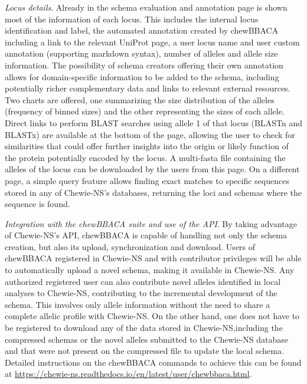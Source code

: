 \textit{Locus details}. Already in the schema evaluation and annotation page is shown most of the information of each locus. This includes the internal locus identification and label, the automated annotation created by chewBBACA including a link to the relevant UniProt \cite{uniprot_consortium_uniprot_2019} page, a user locus name and user custom annotation (supporting markdown syntax), number of alleles and allele size information. The possibility of schema creators offering their own annotation allows for domain-specific information to be added to the schema, including potentially richer complementary data and links to relevant external resources. Two charts are offered, one summarizing the size distribution of the alleles (frequency of binned sizes) and the other representing the sizes of each allele. Direct links to perform \ac{BLAST} searches using allele 1 of that locus (\ac{BLASTn} and \ac{BLASTx}) are available at the bottom of the page, allowing the user to check for similarities that could offer further insights into the origin or likely function of the protein potentially encoded by the locus. A multi-fasta file containing the alleles of the locus can be downloaded by the users from this page. On a different page, a simple query feature allows finding exact matches to specific sequences stored in any of \ac{Chewie-NS}’s databases, returning the loci and schemas where the sequence is found.

\textit{Integration with the chewBBACA suite and use of the API}. By taking advantage of \ac{Chewie-NS}’s \ac{API}, chewBBACA is capable of handling not only the schema creation, but also its upload, synchronization and download. Users of chewBBACA registered in \ac{Chewie-NS} and with contributor privileges will be able to automatically upload a novel schema, making it available in \ac{Chewie-NS}. Any authorized registered user can also contribute novel alleles identified in local analyses to \ac{Chewie-NS}, contributing to the incremental development of the schema. This involves only allele information without the need to share a complete allelic profile with \ac{Chewie-NS}. On the other hand, one does not have to be registered to download any of the data stored in \ac{Chewie-NS},including the compressed schemas or the novel alleles submitted to the \ac{Chewie-NS} database and that were not present on the compressed file to update the local schema. Detailed instructions on the chewBBACA commands to achieve this can be found at \url{https://chewie-ns.readthedocs.io/en/latest/user/chewbbaca.html}.

